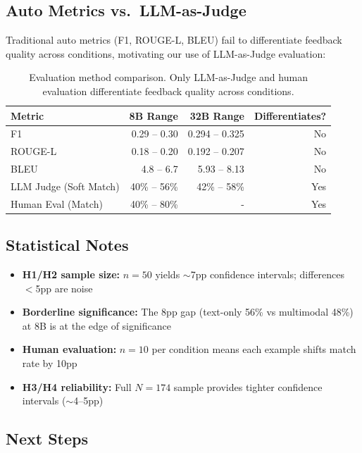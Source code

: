 \documentclass{article} %
\begin{document}
\subsection{Auto Metrics vs.\ LLM-as-Judge}

Traditional auto metrics (F1, ROUGE-L, BLEU) fail to differentiate feedback quality across conditions, motivating our use of LLM-as-Judge evaluation:

\begin{table}[h]
\centering
\small
\begin{tabular}{@{}lrrr@{}}
\toprule
Metric & 8B Range & 32B Range & Differentiates? \\
\midrule
F1 & 0.29 -- 0.30 & 0.294 -- 0.325 & No \\
ROUGE-L & 0.18 -- 0.20 & 0.192 -- 0.207 & No \\
BLEU & 4.8 -- 6.7 & 5.93 -- 8.13 & No \\
LLM Judge (Soft Match) & 40\% -- 56\% & 42\% -- 58\% & Yes \\
Human Eval (Match) & 40\% -- 80\% & - & Yes \\
\bottomrule
\end{tabular}
\caption{Evaluation method comparison. Only LLM-as-Judge and human evaluation differentiate feedback quality across conditions.}
\label{tab:auto_metrics}
\end{table}

\subsection{Statistical Notes}

\begin{itemize}[itemsep=1pt, topsep=2pt, leftmargin=*]
  \item \textbf{H1/H2 sample size:} $n{=}50$ yields ${\sim}$7pp confidence intervals; differences $<$5pp are noise
  \item \textbf{Borderline significance:} The 8pp gap (text-only 56\% vs multimodal 48\%) at 8B is at the edge of significance
  \item \textbf{Human evaluation:} $n{=}10$ per condition means each example shifts match rate by 10pp
  \item \textbf{H3/H4 reliability:} Full $N{=}174$ sample provides tighter confidence intervals (${\sim}$4--5pp)
\end{itemize}

\subsection{Next Steps}
\end{document}
